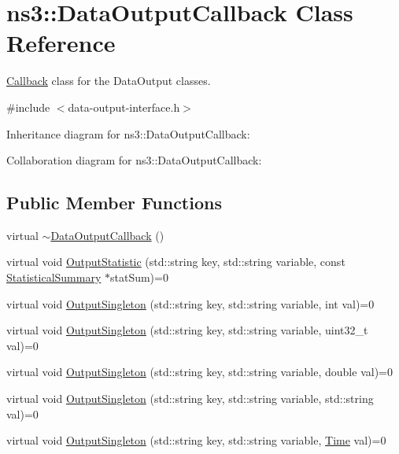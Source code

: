 \hypertarget{classns3_1_1DataOutputCallback}{}\section{ns3\+:\+:Data\+Output\+Callback Class Reference}
\label{classns3_1_1DataOutputCallback}


\hyperlink{classns3_1_1Callback}{Callback} class for the Data\+Output classes.  




{\ttfamily \#include $<$data-\/output-\/interface.\+h$>$}



Inheritance diagram for ns3\+:\+:Data\+Output\+Callback\+:


Collaboration diagram for ns3\+:\+:Data\+Output\+Callback\+:
\subsection*{Public Member Functions}
\begin{DoxyCompactItemize}
\item 
virtual \hyperlink{classns3_1_1DataOutputCallback_a366ed71d714f99a2a0f4e9adedd6db90}{$\sim$\+Data\+Output\+Callback} ()
\item 
virtual void \hyperlink{classns3_1_1DataOutputCallback_a816f8b553f4c30e2900e80b7fd9c43b6}{Output\+Statistic} (std\+::string key, std\+::string variable, const \hyperlink{classns3_1_1StatisticalSummary}{Statistical\+Summary} $\ast$stat\+Sum)=0
\item 
virtual void \hyperlink{classns3_1_1DataOutputCallback_af7c9dd0d0cda106084ec9400135a78ff}{Output\+Singleton} (std\+::string key, std\+::string variable, int val)=0
\item 
virtual void \hyperlink{classns3_1_1DataOutputCallback_a10ba98730d22ab1c3fc82c3419bc678e}{Output\+Singleton} (std\+::string key, std\+::string variable, uint32\+\_\+t val)=0
\item 
virtual void \hyperlink{classns3_1_1DataOutputCallback_ab40324c67753656458d51621b3f7acc2}{Output\+Singleton} (std\+::string key, std\+::string variable, double val)=0
\item 
virtual void \hyperlink{classns3_1_1DataOutputCallback_a72fc6c0327d2d08e2e3cb01ad0bb90de}{Output\+Singleton} (std\+::string key, std\+::string variable, std\+::string val)=0
\item 
virtual void \hyperlink{classns3_1_1DataOutputCallback_a83433d7c0a648d2049c459283955918b}{Output\+Singleton} (std\+::string key, std\+::string variable, \hyperlink{classns3_1_1Time}{Time} val)=0
\end{DoxyCompactItemize}


